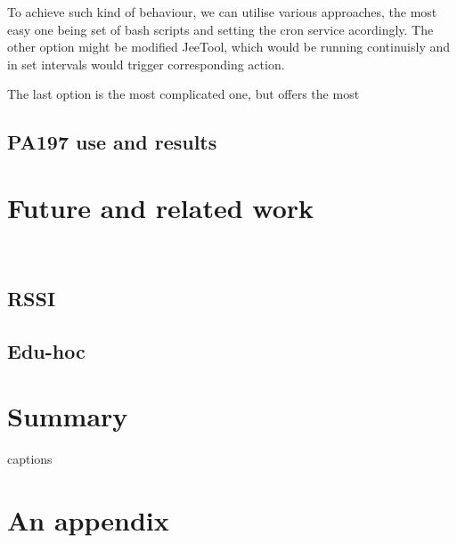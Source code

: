 \documentclass[
  digital, %
  table,   %
  nolof,     %
  nolot,     %
           oneside
]{fithesis3}
\begin{document}
  To achieve such kind of behaviour, we can utilise various approaches, the most easy one being set of bash scripts and setting the cron service %
  acordingly. The other option might be modified JeeTool, which would be running continuisly and in set intervals would trigger corresponding action.

  The last option is the most complicated one, but offers the most

  \section{PA197 use and results} \label{sec:PA197}
\chapter{Future and related work}\
  \section{RSSI}
  \section{Edu-hoc}
\chapter{Summary}




{\csname captions\languagename\endcsname %
\makeatletter %
  \thesis@selectLocale{\thesis@locale}\makeatother
\printbibliography[heading=bibintoc]} %

\appendix %
\chapter{An appendix}
\end{document}
